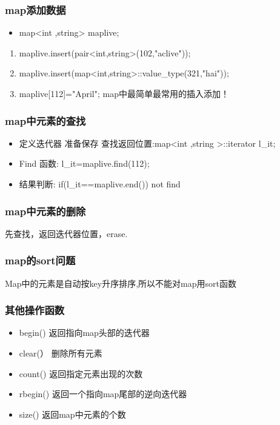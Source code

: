 \documentclass[UTF8,a4paper,12pt]{ctexbook}
\begin{document}
			\subsubsection{map添加数据}
				\begin{itemize}
					\item map<int ,string> maplive;
				\end{itemize}
				\begin{enumerate}
					\item maplive.insert(pair<int,string>(102,"aclive"));
					\item maplive.insert(map<int,string>::value\_type(321,"hai"));
					\item maplive[112]="April";    map中最简单最常用的插入添加！
				\end{enumerate}
			\subsubsection{map中元素的查找}
				\begin{itemize}
					\item 定义迭代器 准备保存 查找返回位置:map<int ,string >::iterator l\_it;
					\item Find 函数: l\_it=maplive.find(112);
					\item 结果判断: if(l\_it==maplive.end()) not find
				\end{itemize}
			\subsubsection{map中元素的删除}
				先查找，返回迭代器位置，erase.
				
			\subsubsection{map的sort问题} 
				Map中的元素是自动按key升序排序,所以不能对map用sort函数 
			
			\subsubsection{其他操作函数}
				\begin{itemize}
					\item begin()          返回指向map头部的迭代器
					\item clear(）         删除所有元素
					\item count()          返回指定元素出现的次数
					\item rbegin()         返回一个指向map尾部的逆向迭代器
					\item size()           返回map中元素的个数
				\end{itemize}
	 	
\end{document}
